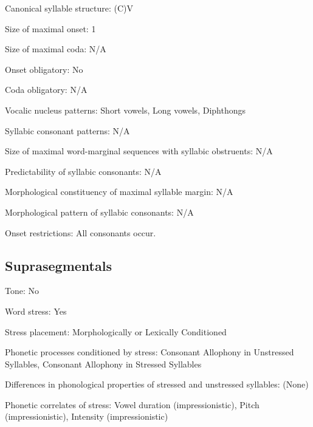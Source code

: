 {\begin{appendixdesc}
\item[Canonical syllable structure:] (C)V \citep[533--538]{Bauer1999}

\item[Size of maximal onset:] 1

\item[Size of maximal coda:] N/A

\item[Onset obligatory:] No

\item[Coda obligatory:] N/A

\item[Vocalic nucleus patterns:] Short vowels, Long vowels, Diphthongs

\item[Syllabic consonant patterns:] N/A

\item[Size of maximal word-marginal sequences with syllabic obstruents:] N/A

\item[Predictability of syllabic consonants:] N/A

\item[Morphological constituency of maximal syllable margin:] N/A

\item[Morphological pattern of syllabic consonants:] N/A

\item[Onset restrictions:] All consonants occur.
\end{appendixdesc}
\subsection*{Suprasegmentals}
\begin{appendixdesc}
\item[Tone:] No

\item[Word stress:] Yes

\item[Stress placement:] Morphologically or Lexically Conditioned

\item[Phonetic processes conditioned by stress:] Consonant Allophony in Unstressed Syllables, Consonant Allophony in Stressed Syllables

\item[Differences in phonological properties of stressed and unstressed syllables:] (None)

\item[Phonetic correlates of stress:] Vowel duration (impressionistic), Pitch (impressionistic), Intensity (impressionistic)


\end{appendixdesc}}
